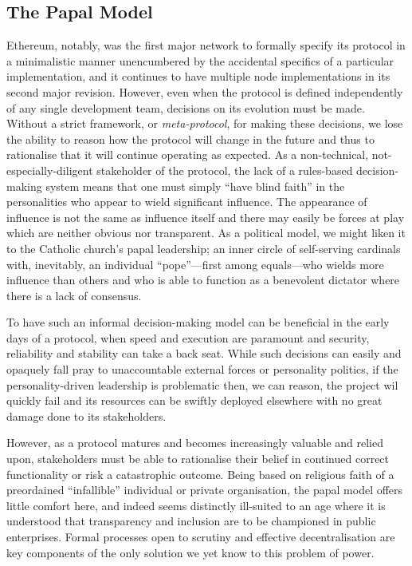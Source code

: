 \documentclass[9pt,oneside]{amsart}
\begin{document}
\subsection{The Papal Model}

Ethereum, notably, was the first major network to formally specify its protocol\cite{TODO} in a minimalistic manner unencumbered by the accidental specifics of a particular implementation, and it continues to have multiple node implementations in its second major revision. However, even when the protocol is defined independently of any single development team, decisions on its evolution must be made. Without a strict framework, or \emph{meta-protocol}, for making these decisions, we lose the ability to reason how the protocol will change in the future and thus to rationalise that it will continue operating as expected. As a non-technical, not-especially-diligent stakeholder of the protocol, the lack of a rules-based decision-making system means that one must simply ``have blind faith'' in the personalities who appear to wield significant influence. The appearance of influence is not the same as influence itself and there may easily be forces at play which are neither obvious nor transparent. As a political model, we might liken it to the Catholic church's papal leadership; an inner circle of self-serving cardinals with, inevitably, an individual ``pope''---first among equals---who wields more influence than others and who is able to function as a benevolent dictator where there is a lack of consensus.

To have such an informal decision-making model can be beneficial in the early days of a protocol, when speed and execution are paramount and security, reliability and stability can take a back seat. While such decisions can easily and opaquely fall pray to unaccountable external forces or personality politics, if the personality-driven leadership is problematic then, we can reason, the project wil quickly fail and its resources can be swiftly deployed elsewhere with no great damage done to its stakeholders.

However, as a protocol matures and becomes increasingly valuable and relied upon, stakeholders must be able to rationalise their belief in continued correct functionality or risk a catastrophic outcome. Being based on religious faith of a preordained ``infallible'' individual or private organisation, the papal model offers little comfort here, and indeed seems distinctly ill-suited to an age where it is understood that transparency and inclusion are to be championed in public enterprises. Formal processes open to scrutiny and effective decentralisation are key components of the only solution we yet know to this problem of power.
\end{document}
